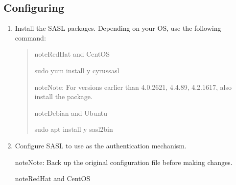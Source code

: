 \documentclass[letterpaper,10pt,english]{sphinxmanual}
\begin{document}
\subsection{Configuring }
\label{\detokenize{sasl-auth:configuring-saslauthd}}\begin{enumerate}
%
\item {} 
\sphinxAtStartPar
Install the SASL packages. Depending on your OS, use the following command:
\begin{quote}

\begin{sphinxadmonition}{note}{RedHat and CentOS}

\begin{sphinxVerbatim}[commandchars=\\\{\}]
\PYGZdl{} sudo yum install \PYGZhy{}y cyrus\PYGZhy{}sasl
\end{sphinxVerbatim}

\begin{sphinxadmonition}{note}{Note:}
\sphinxAtStartPar
For  versions earlier than 4.0.26\sphinxhyphen{}21,  4.4.8\sphinxhyphen{}9, 4.2.16\sphinxhyphen{}17, also install the  package.
\end{sphinxadmonition}
\end{sphinxadmonition}

\begin{sphinxadmonition}{note}{Debian and Ubuntu}

\begin{sphinxVerbatim}[commandchars=\\\{\}]
\PYGZdl{} sudo apt install \PYGZhy{}y sasl2\PYGZhy{}bin
\end{sphinxVerbatim}
\end{sphinxadmonition}
\end{quote}

\item {} 
\sphinxAtStartPar
Configure SASL to use  as the  authentication mechanism.

\begin{sphinxadmonition}{note}{Note:}
\sphinxAtStartPar
Back up the original configuration file before making changes.

\begin{sphinxadmonition}{note}{RedHat and CentOS}


\end{sphinxadmonition}
\end{sphinxadmonition}
\end{enumerate}
\end{document}
